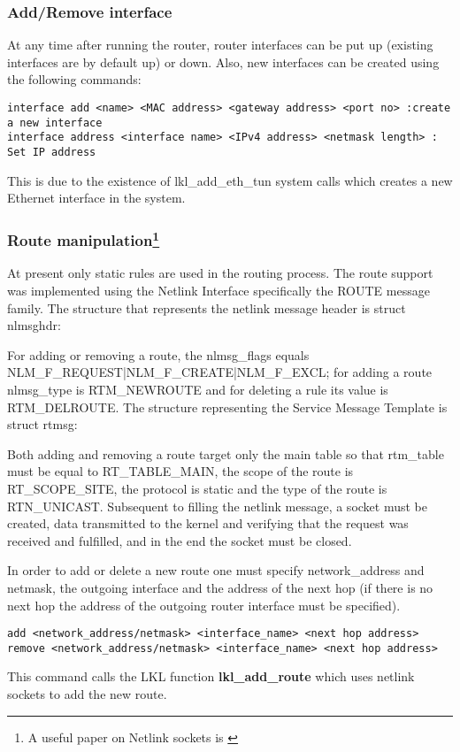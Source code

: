 {{\subsubsection{Add/Remove interface}
At any time after running the router, router interfaces can be put up (existing interfaces are by default up) 
or down. Also, new interfaces can be created using the following commands:
\lstset{language=TeX,caption=Adding a new interface,label=lst:saddrule}
\begin{lstlisting}
interface add <name> <MAC address> <gateway address> <port no> :create a new interface
interface address <interface name> <IPv4 address> <netmask length> : Set IP address 
\end{lstlisting}  
This is due to the existence of lkl_add_eth_tun system calls which creates a new Ethernet interface in the system.
 
\subsubsection[Route manipulation]{Route manipulation\footnote{A useful paper on Netlink sockets is \cite{netlinksockets}}}
At present only static rules are used in the routing process.
The route support was implemented using the Netlink Interface specifically the ROUTE message family.
The structure that represents the netlink message header is struct nlmsghdr:
\lstset{language=C, caption=Netlink Message Header Structure}

For adding or removing a route, the nlmsg_flags equals NLM_F_REQUEST|NLM_F_CREATE|NLM_F_EXCL; for adding a route nlmsg_type is RTM_NEWROUTE and for deleting a rule its value is RTM_DELROUTE. 
The structure representing the Service Message Template is struct rtmsg:
\lstset{language=C, caption=Service Message Template Structure}

Both adding and removing a route target only the main table so that rtm_table must be equal to RT_TABLE_MAIN, the scope of the route is RT_SCOPE_SITE, the protocol is static and the type of the route is RTN_UNICAST.
Subsequent to filling the netlink message, a socket must be created, data transmitted to the kernel and verifying that the request was received and fulfilled, and in the end the socket must be closed.
\lstset{language=C, caption=Communicating with the kernel}
  

In order to add or delete a new route one must specify network_address and netmask, the outgoing interface and 
the address of the next hop (if there is no next hop the address of the outgoing router interface must be specified).
\lstset{language=TeX,caption=Adding a new interface,label=lst:saddrule}
\begin{lstlisting}
add <network_address/netmask> <interface_name> <next hop address>
remove <network_address/netmask> <interface_name> <next hop address>
\end{lstlisting}  
This command calls the LKL function {\bf lkl_add_route} which uses netlink sockets to add the new route.

}}
